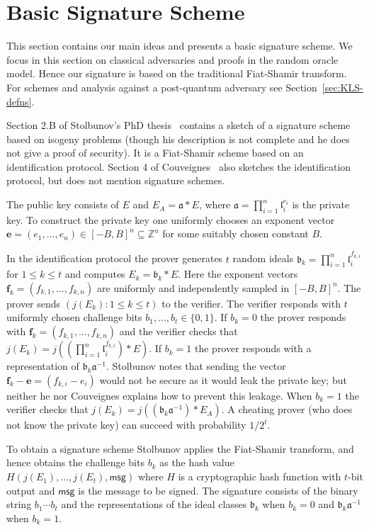 \documentclass{llncs}
\newcommand{\Z}{\mathbb{Z}}
\newcommand{\msg}{\textsf{msg}}
\renewcommand{\a}{\mathfrak{a}}
\renewcommand{\b}{\mathfrak{b}}
\renewcommand{\l}{\mathfrak{l}}
\newcommand{\e}{\textbf{e}}
\newcommand{\f}{\textbf{f}}
\begin{document}
\section{Basic Signature Scheme}\label{sec:basic-scheme}

This section contains our main ideas and presents a basic signature scheme.
We focus in this section on classical adversaries and proofs in the random oracle model.
Hence our signature is based on the traditional Fiat-Shamir transform.
For schemes and analysis against a post-quantum adversary see Section~\ref{sec:KLS-defns}.


Section 2.B of Stolbunov's PhD thesis~\cite{Sto12} contains a sketch of a signature scheme based on isogeny problems (though his description is not complete and he does not give a proof of security).
It is a Fiat-Shamir scheme based on an identification protocol.
Section 4 of Couveignes~\cite{Couv06} also sketches the identification protocol, but does not mention signature schemes.


The public key consists of $E$ and $E_A = \a * E$, where $\a = \prod_{i=1}^n \l_i^{e_i}$ is the private key.
To construct the private key one uniformly chooses an exponent vector $\e = (e_1, \dots, e_n) \in [-B,B]^n \subseteq \Z^n$ for some suitably chosen constant $B$.

In the identification protocol the prover generates $t$ random ideals $\b_k = \prod_{i=1}^n \l_i^{f_{k,i}}$ for $1 \le k \le t$ and computes $E_k = \b_k * E$.
Here the exponent vectors $\f_k = ( f_{k,1}, \dots, f_{k,n} )$ are uniformly and independently sampled in $[-B,B]^n$.
The prover sends $(j( E_k ) : 1 \le k \le t )$ to the verifier.
The verifier responds with $t$ uniformly chosen challenge bits $b_1, \dots, b_t \in \{0,1\}$.
If $b_k = 0$ the prover responds with $\f_k = ( f_{k,1}, \dots, f_{k,n} )$ and the verifier checks that $j(E_k) = j( (\prod_{i=1}^n \l_i^{f_{k,i}}) * E )$.
If $b_k = 1$ the prover responds with a representation of $\b_k \a^{-1}$. Stolbunov notes that sending the vector $\f_k - \e = (f_{k,i} - e_i )$ would not be secure as it would leak the private key; but neither he nor Couveignes explains how to prevent this leakage.
When $b_k=1$ the verifier checks that $j(E_k) = j( (\b_k \a^{-1}) * E_A )$.
A cheating prover (who does not know the private key) can succeed with probability $1/2^t$.

To obtain a signature scheme Stolbunov applies the Fiat-Shamir transform, and hence obtains the challenge bits $b_k$ as the hash value $H( j(E_1), \dots, j(E_t) , \msg )$ where $H$ is a cryptographic hash function with $t$-bit output and $\msg$ is the message to be signed.
The signature consists of the binary string $b_1\cdots b_t$ and the representations of the ideal classes $\b_k$ when $b_k = 0$ and $\b_k \a^{-1}$ when $b_k = 1$.
\end{document}
